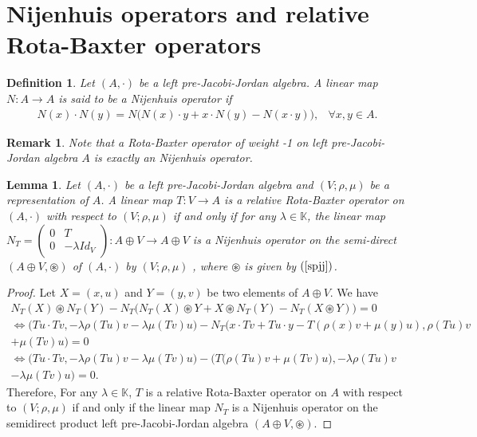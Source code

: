\documentclass[12pt]{amsart}
\newtheorem{definition}[Theorem]{Definition}
\newtheorem{remark}[Theorem]{Remark}
\newtheorem{lemma}[Theorem]{Lemma}
\begin{document}
\section{Nijenhuis operators and relative Rota-Baxter operators}
\begin{definition}\cite{aod}\label{D13}
	Let $ (A,\cdot) $ be a left pre-Jacobi-Jordan algebra. A linear map $ N : A\to A $ is said to be a Nijenhuis operator if 
	\begin{eqnarray}
		\label{9}
		N(x)\cdot N(y)=N\bigg(N(x)\cdot y+x\cdot N(y)-N(x\cdot y)\bigg),&\forall x,y\in A.
	\end{eqnarray}
\end{definition}
\begin{remark}
	Note that a Rota-Baxter operator of weight -1 on left pre-Jacobi-Jordan algebra $ A $ is exactly an Nijenhuis operator.
\end{remark}
\begin{lemma} \label{l3}	
	Let $ (A,\cdot) $ be a left  pre-Jacobi-Jordan algebra and $ (V;\rho,\mu) $ be a representation of $A$. A linear map $ T : V\to A $ is a relative Rota-Baxter operator on $ (A,\cdot) $ with respect  to $ (V;\rho,\mu) $ if and only if for any $ \lambda \in \mathbb{K} $, the linear map $ N_{T}=\begin{pmatrix} 0&T\\ 0&-\lambda Id_{V} \end{pmatrix} :  A\oplus V\to A\oplus V $ is a Nijenhuis operator on the semi-direct  $ (A\oplus V,\circledast) $ of  $ (A,\cdot) $ by $ (V;\rho,\mu) $ , where $ \circledast $ is given by $ (\ref{spjj})$.	
\end{lemma}
\begin{proof}
	Let $ X=(x,u) $ and $ Y=(y,v) $ be two elements of $ A\oplus V $. We have\\
	$ \begin{array}{lll}
		N_{T}(X)\circledast N_{T}(Y)-N_{T}\bigg(N_{T}(X)\circledast Y+X \circledast N_{T}(Y)-N_{T}(X\circledast Y)\bigg)=0\\
		\iff \bigg(Tu\cdot Tv,-\lambda\rho(Tu)v-\lambda\mu(Tv)u\bigg)-N_{T}\bigg(x\cdot Tv+Tu\cdot y-T(\rho(x)v+\mu(y)u), \rho(Tu)v\\
		+\mu(Tv)u\bigg)
		=0\\
		\iff\bigg(Tu\cdot Tv,-\lambda\rho(Tu)v-\lambda\mu(Tv)u\bigg)-\bigg(T\bigg(\rho(Tu)v+\mu(Tv)u\bigg),-\lambda\rho(Tu)v\\
		-\lambda\mu(Tv)u\bigg)=0.
	\end{array} $\\
	Therefore,  For any $ \lambda \in \mathbb{K} $, $ T $ is a relative Rota-Baxter operator on $ A $ with respect  to $ (V;\rho,\mu) $ if and only if the linear map $ N_{T}$ is a Nijenhuis operator on the semidirect product left pre-Jacobi-Jordan algebra $ (A\oplus V,\circledast)$.  
\end{proof}
\end{document}
